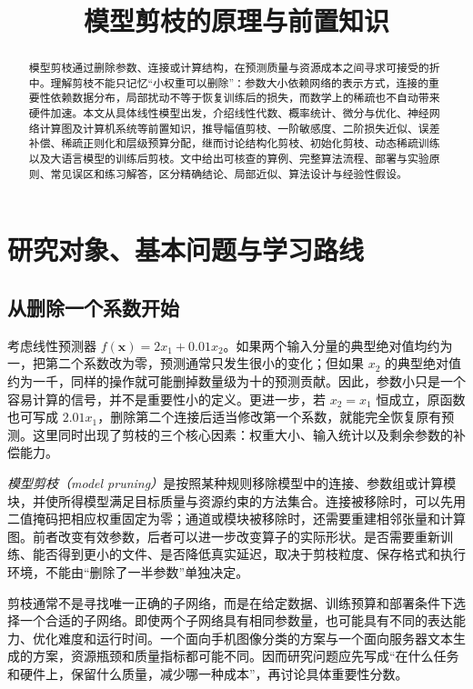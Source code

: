 \documentclass[UTF8,12pt,a4paper,fontset=fandol]{ctexart}
\title{模型剪枝的原理与前置知识}
\author{}
\date{}
\begin{document}
\maketitle

\begin{abstract}
模型剪枝通过删除参数、连接或计算结构，在预测质量与资源成本之间寻求可接受的折中。理解剪枝不能只记忆“小权重可以删除”：参数大小依赖网络的表示方式，连接的重要性依赖数据分布，局部扰动不等于恢复训练后的损失，而数学上的稀疏也不自动带来硬件加速。本文从具体线性模型出发，介绍线性代数、概率统计、微分与优化、神经网络计算图及计算机系统等前置知识，推导幅值剪枝、一阶敏感度、二阶损失近似、误差补偿、稀疏正则化和层级预算分配，继而讨论结构化剪枝、初始化剪枝、动态稀疏训练以及大语言模型的训练后剪枝。文中给出可核查的算例、完整算法流程、部署与实验原则、常见误区和练习解答，区分精确结论、局部近似、算法设计与经验性假设。
\end{abstract}
\tableofcontents

\section{研究对象、基本问题与学习路线}
\label{sec:prune-introduction}

\subsection{从删除一个系数开始}
考虑线性预测器 $f(\mathbf x)=2x_1+0.01x_2$。如果两个输入分量的典型绝对值均约为一，把第二个系数改为零，预测通常只发生很小的变化；但如果 $x_2$ 的典型绝对值约为一千，同样的操作就可能删掉数量级为十的预测贡献。因此，参数小只是一个容易计算的信号，并不是重要性小的定义。更进一步，若 $x_2=x_1$ 恒成立，原函数也可写成 $2.01x_1$，删除第二个连接后适当修改第一个系数，就能完全恢复原有预测。这里同时出现了剪枝的三个核心因素：权重大小、输入统计以及剩余参数的补偿能力。

\emph{模型剪枝（model pruning）}是按照某种规则移除模型中的连接、参数组或计算模块，并使所得模型满足目标质量与资源约束的方法集合。连接被移除时，可以先用二值掩码把相应权重固定为零；通道或模块被移除时，还需要重建相邻张量和计算图。前者改变有效参数，后者可以进一步改变算子的实际形状。是否需要重新训练、能否得到更小的文件、是否降低真实延迟，取决于剪枝粒度、保存格式和执行环境，不能由“删除了一半参数”单独决定。

剪枝通常不是寻找唯一正确的子网络，而是在给定数据、训练预算和部署条件下选择一个合适的子网络。即使两个子网络具有相同参数量，也可能具有不同的表达能力、优化难度和运行时间。一个面向手机图像分类的方案与一个面向服务器文本生成的方案，资源瓶颈和质量指标都可能不同。因而研究问题应先写成“在什么任务和硬件上，保留什么质量，减少哪一种成本”，再讨论具体重要性分数。
\end{document}
